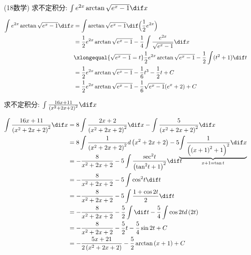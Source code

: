 \documentclass[color=green,titlestyle=hang]{elegantbook}%
\begin{document}
\begin{example}
(18数学) 求不定积分: $\int e^{2x}\arctan\sqrt{e^x-1}\dif x$
\end{example}\begin{solution}
\begin{align*}
\int e^{2x}\arctan\sqrt{e^x-1}\dif x
&=\int \arctan\sqrt{e^x-1}\dif\Big(\frac{1}{2}e^{2x}\Big)\\
&=\frac{1}{2}e^{2x}\arctan\sqrt{e^x-1}-\frac{1}{4}\int\frac{e^{2x}}{\sqrt{e^x-1}}\dif x\\
&\xlongequal{\sqrt{e^x-1}=t}\frac{1}{2}e^{2x}\arctan\sqrt{e^x-1}-\frac{1}{2}\int(t^2+1)\dif t\\
&=\frac{1}{2}e^{2x}\arctan\sqrt{e^x-1}-\frac{1}{6}t^3-\frac{1}{2}t+C\\
&=\frac{1}{2}e^{2x}\arctan\sqrt{e^x-1}-\frac{1}{6}\sqrt{e^x-1}(e^x+2)+C
\end{align*}
\end{solution}

\begin{exercise}
求不定积分: $\int {\frac{{16x + 11}}{{{{\left( {{x^2} + 2x + 2} \right)}^2}}}} \dif x$
\end{exercise}\begin{Solution}
\begin{align*}
\int {\frac{{16x + 11}}{{{{\left( {{x^2} + 2x + 2} \right)}^2}}}} \dif x &= 8\int {\frac{{2x + 2}}{{{{\left( {{x^2} + 2x + 2} \right)}^2}}}} \dif x - \int {\frac{5}{{{{\left( {{x^2} + 2x + 2} \right)}^2}}}} \dif x\\
&= 8\int {\frac{1}{{{{\left( {{x^2} + 2x + 2} \right)}^2}}}} d\left( {{x^2} + 2x + 2} \right) - 5\smash{\underbrace{\int {\frac{1}{{{{\left( {{{\left( {x + 1} \right)}^2} + 1} \right)}^2}}}} \dif x}\limits_{x+1=\tan t}}\\
&=  - \frac{8}{{{x^2} + 2x + 2}} - 5\int {\frac{{{{\sec }^2}t}}{{{{\left( {{{\tan }^2}t + 1} \right)}^2}}}} \dif t\\
&=  - \frac{8}{{{x^2} + 2x + 2}} - 5\int {{{\cos }^2}t} \dif t\\
& =  - \frac{8}{{{x^2} + 2x + 2}} - 5\int {\frac{{1 + \cos 2t}}{2}} \dif t\\
&=  - \frac{8}{{{x^2} + 2x + 2}} - \frac{5}{2}\int {\dif t}  - \frac{5}{4}\int {\cos 2t} d\left( {2t} \right)\\
&=  - \frac{8}{{{x^2} + 2x + 2}} - \frac{5}{2}t - \frac{5}{4}\sin 2t + C\\
& =  - \frac{{5x + 21}}{{2\left( {{x^2} + 2x + 2} \right)}} - \frac{5}{2}\arctan \left( {x + 1} \right) + C
\end{align*}	
\end{Solution}
\end{document}
